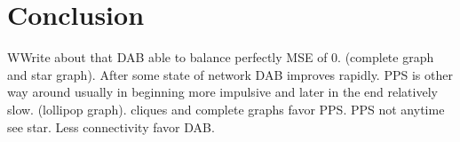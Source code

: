 \chapter{Conclusion}\label{chap:conclusion}
WWrite about that DAB able to balance perfectly MSE of 0. (complete graph and star graph). After some state of network DAB improves rapidly. PPS is other way around usually in beginning more impulsive and later in the end relatively slow. (lollipop graph). cliques and complete graphs favor PPS. PPS not anytime see star. Less connectivity favor DAB.